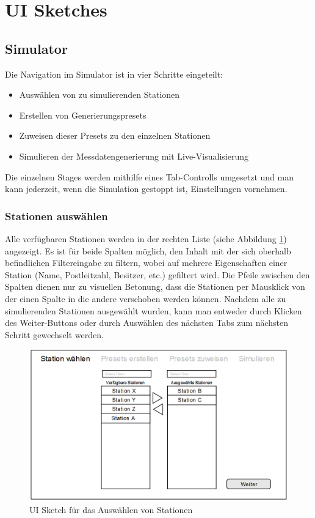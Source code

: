 \section{UI Sketches}
\setlength{\parindent}{0ex}
\subsection{Simulator}

Die Navigation im Simulator ist in vier Schritte eingeteilt:
\begin{itemize}
    \item Auswählen von zu simulierenden Stationen
    \item Erstellen von Generierungspresets
    \item Zuweisen dieser Presets zu den einzelnen Stationen
    \item Simulieren der Messdatengenerierung mit Live-Visualisierung
\end{itemize}

Die einzelnen Stages werden mithilfe eines Tab-Controlls umgesetzt und man kann jederzeit, wenn die Simulation gestoppt ist, Einstellungen vornehmen.

\subsubsection{Stationen auswählen}

Alle verfügbaren Stationen werden in der rechten Liste (siehe Abbildung \ref{fig:sketch_select_station}) angezeigt. Es ist für beide Spalten möglich, den Inhalt mit der sich oberhalb befindlichen Filtereingabe zu filtern, wobei auf mehrere Eigenschaften einer Station (Name, Postleitzahl, Besitzer, etc.) gefiltert wird. Die Pfeile zwischen den Spalten dienen nur zu visuellen Betonung, dass die Stationen per Mausklick von der einen Spalte in die andere verschoben werden können. Nachdem alle zu simulierenden Stationen ausgewählt wurden, kann man entweder durch Klicken des \grqq Weiter\glqq-Buttons oder durch Auswählen des nächsten Tabs zum nächsten Schritt gewechselt werden.

\begin{figure}[H]
\centering
\includegraphics[width=1\textwidth]{pictures/sketches/simulator/select_sataion.png}
\caption{UI Sketch für das Auswählen von Stationen}
\label{fig:sketch_select_station}
\end{figure}
\raggedright

